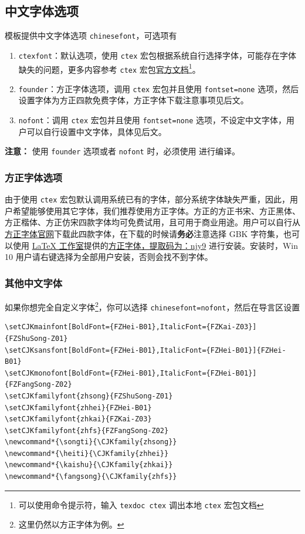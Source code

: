 \documentclass[lang=cn,11pt,a4paper,cite=authoryear]{elegantpaper}
\begin{document}
\subsection{中文字体选项}
模板提供中文字体选项 \lstinline{chinesefont}，可选项有
\begin{enumerate}
\item \lstinline{ctexfont}：默认选项，使用 \lstinline{ctex} 宏包根据系统自行选择字体，可能存在字体缺失的问题，更多内容参考 \lstinline{ctex} 宏包\href{https://ctan.org/pkg/ctex}{官方文档}\footnote{可以使用命令提示符，输入 \lstinline{texdoc ctex} 调出本地 \lstinline{ctex} 宏包文档}。
\item \lstinline{founder}：方正字体选项，调用 \lstinline{ctex} 宏包并且使用 \lstinline{fontset=none} 选项，然后设置字体为方正四款免费字体，方正字体下载注意事项见后文。
\item \lstinline{nofont}：调用 \lstinline{ctex} 宏包并且使用 \lstinline{fontset=none} 选项，不设定中文字体，用户可以自行设置中文字体，具体见后文。
\end{enumerate}

\noindent \textbf{注意：} 使用 \lstinline{founder} 选项或者 \lstinline{nofont} 时，必须使用  进行编译。

\subsubsection{方正字体选项}
由于使用 \lstinline{ctex} 宏包默认调用系统已有的字体，部分系统字体缺失严重，因此，用户希望能够使用其它字体，我们推荐使用方正字体。方正的{\songti 方正书宋}、{\heiti 方正黑体}、{\kaishu 方正楷体}、{\fangsong 方正仿宋}四款字体均可免费试用，且可用于商业用途。用户可以自行从\href{http://www.foundertype.com/}{方正字体官网}下载此四款字体，在下载的时候请\textbf{务必}注意选择 GBK 字符集，也可以使用 \href{https://www.latexstudio.net/}{\LaTeX{} 工作室}提供的\href{https://pan.baidu.com/s/1BgbQM7LoinY7m8yeP25Y7Q}{方正字体，提取码为：njy9} 进行安装。安装时，{\kaishu Win 10 用户请右键选择为全部用户安装，否则会找不到字体。}

\begin{figure}[!htb]
\centering

\end{figure}

\subsubsection{其他中文字体}
如果你想完全自定义字体\footnote{这里仍然以方正字体为例。}，你可以选择 \lstinline{chinesefont=nofont}，然后在导言区设置
\begin{lstlisting}
\setCJKmainfont[BoldFont={FZHei-B01},ItalicFont={FZKai-Z03}]{FZShuSong-Z01}
\setCJKsansfont[BoldFont={FZHei-B01},ItalicFont={FZHei-B01}]{FZHei-B01}
\setCJKmonofont[BoldFont={FZHei-B01},ItalicFont={FZHei-B01}]{FZFangSong-Z02}
\setCJKfamilyfont{zhsong}{FZShuSong-Z01}
\setCJKfamilyfont{zhhei}{FZHei-B01}
\setCJKfamilyfont{zhkai}{FZKai-Z03}
\setCJKfamilyfont{zhfs}{FZFangSong-Z02}
\newcommand*{\songti}{\CJKfamily{zhsong}}
\newcommand*{\heiti}{\CJKfamily{zhhei}}
\newcommand*{\kaishu}{\CJKfamily{zhkai}}
\newcommand*{\fangsong}{\CJKfamily{zhfs}}
\end{lstlisting}
\end{document}
